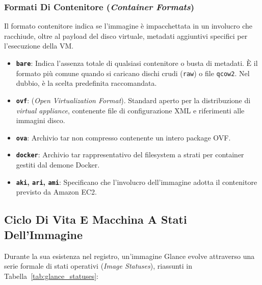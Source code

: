 \documentclass[11pt, a4paper]{article}
\begin{document}
\subsubsection{Formati Di Contenitore (\emph{Container Formats})}
Il formato contenitore indica se l'immagine è impacchettata in un involucro che racchiude, oltre al payload del disco virtuale, metadati aggiuntivi specifici per l'esecuzione della VM.
\begin{itemize}[noitemsep]
    \item \textbf{\texttt{bare}}: Indica l'assenza totale di qualsiasi contenitore o busta di metadati. È il formato più comune quando si caricano dischi crudi (\texttt{raw}) o file \texttt{qcow2}. Nel dubbio, è la scelta predefinita raccomandata.
    \item \textbf{\texttt{ovf}}: (\emph{Open Virtualization Format}). Standard aperto per la distribuzione di \emph{virtual appliance}, contenente file di configurazione XML e riferimenti alle immagini disco.
    \item \textbf{\texttt{ova}}: Archivio tar non compresso contenente un intero package OVF.
    \item \textbf{\texttt{docker}}: Archivio tar rappresentativo del filesystem a strati per container gestiti dal demone Docker.
    \item \textbf{\texttt{aki}, \texttt{ari}, \texttt{ami}}: Specificano che l'involucro dell'immagine adotta il contenitore previsto da Amazon EC2.
\end{itemize}

\subsection{Ciclo Di Vita E Macchina A Stati Dell'Immagine}


Durante la sua esistenza nel registro, un'immagine Glance evolve attraverso una serie formale di stati operativi (\emph{Image Statuses}), riassunti in Tabella~\ref{tab:glance_statuses}:
\end{document}
